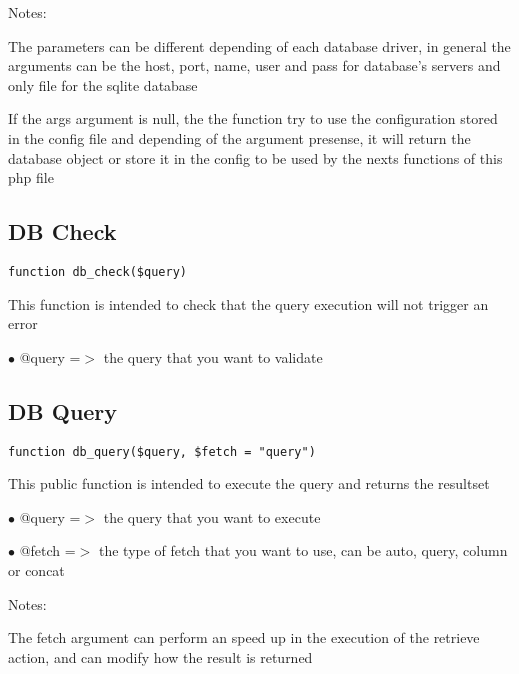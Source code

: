 \documentclass[a4paper]{book}
\begin{document}
Notes:

The parameters can be different depending of each database driver, in general the arguments can
be the host, port, name, user and pass for database's servers and only file for the sqlite database

If the args argument is null, the the function try to use the configuration stored in the config file
and depending of the argument presense, it will return the database object or store it in the config
to be used by the nexts functions of this php file

\hypertarget{toc64}{}
\subsection{DB Check}

\begin{lstlisting}
function db_check($query)
\end{lstlisting}

This function is intended to check that the query execution will not trigger an error

\begin{compactitem}
\item[\color{myblue}$\bullet$] @query =$>$ the query that you want to validate
\end{compactitem}

\hypertarget{toc65}{}
\subsection{DB Query}

\begin{lstlisting}
function db_query($query, $fetch = "query")
\end{lstlisting}

This public function is intended to execute the query and returns the resultset

\begin{compactitem}
\item[\color{myblue}$\bullet$] @query =$>$ the query that you want to execute
\item[\color{myblue}$\bullet$] @fetch =$>$ the type of fetch that you want to use, can be auto, query, column or concat
\end{compactitem}

Notes:

The fetch argument can perform an speed up in the execution of the retrieve action, and
can modify how the result is returned
\end{document}
